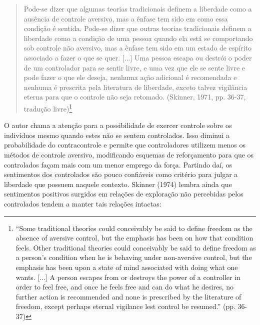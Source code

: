 \begin{quote}
    Pode-se dizer que algumas teorias tradicionais definem a liberdade como a ausência de controle aversivo, mas a ênfase tem sido em como essa condição é sentida. Pode-se dizer que outras teorias tradicionais definem a liberdade como a condição de uma pessoa quando ela está se comportando sob controle não aversivo, mas a ênfase tem sido em um estado de espírito associado a fazer o que se quer. [...] Uma pessoa escapa ou destrói o poder de um controlador para se sentir livre, e uma vez que ele se sente livre e pode fazer o que ele deseja, nenhuma ação adicional é recomendada e nenhuma é prescrita pela literatura de liberdade, exceto talvez vigilância eterna para que o controle não seja retomado. (Skinner, 1971, pp. 36-37, tradução livre)\footnote{``Some traditional theories could conceivably be said to define freedom as the absence of aversive control, but the emphasis has been on how that condition feels. Other traditional theories could conceivably be said to define freedom as a person's condition when he is behaving under non-aversive control, but the emphasis has been upon a state of mind associated with doing what one wants. [...] A person escapes from or destroys the power of a controller in order to feel free, and once he feels free and can do what he desires, no further action is recommended and none is prescribed by the literature of freedom, except perhaps eternal vigilance lest control be resumed.'' (pp. 36-37)}
\end{quote}

O autor chama a atenção para a possibilidade de exercer controle sobre os indivíduos mesmo quando estes não se sentem controlados. Isso diminui a probabilidade do contracontrole e permite que controladores utilizem menos os métodos de controle aversivo, modificando esquemas de reforçamento para que os controlados façam mais com um menor emprego da força. Partindo daí, os sentimentos dos controlados são pouco confiáveis como critério para julgar a liberdade que possuem naquele contexto. Skinner (1974) lembra ainda que sentimentos positivos surgidos em relações de exploração não percebidas pelos controlados tendem a manter tais relações intactas:

